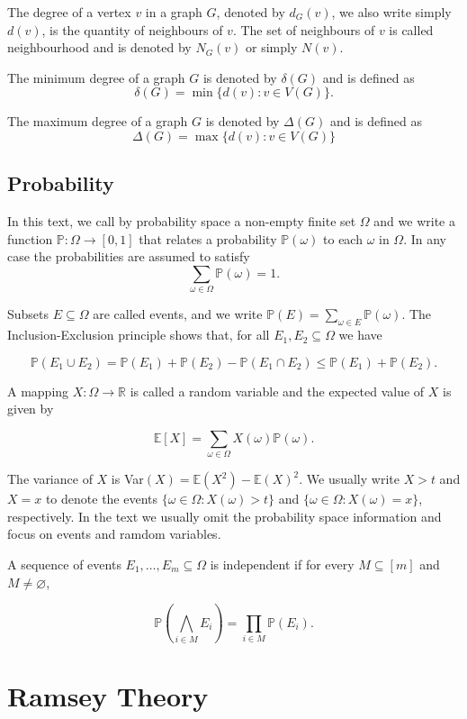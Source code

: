 \documentclass[12pt,twoside,a4paper,bibliography=totocnumbered]{book}
\numberwithin{equation}{section}
\let\emptyset=\varnothing
\theoremstyle{remark}
\begin{document}
The degree of a vertex $v$ in a graph $G$, denoted by $d_G(v)$, we also write simply $d(v)$, is the quantity of neighbours of $v$. The set of neighbours of $v$ is called neighbourhood and is denoted by $N_G(v)$ or simply $N(v)$.

The minimum degree of a graph $G$ is denoted by $\delta(G)$ and is defined as
$$\delta(G) = \min\{d(v) \colon v \in V (G)\}.$$

The maximum degree of a graph $G$ is denoted by $\Delta(G)$ and is defined as 
$$ \Delta(G) = \max\{d(v) \colon v \in V(G)\} $$

\section{Probability}
In this text, we call by probability space a non-empty finite set $\Omega$ and we write a function $\mathbb{P}\colon \Omega \rightarrow [0,1]$ that relates a probability $\mathbb{P}(\omega)$ to each $\omega$ in $\Omega$. In any case the probabilities are assumed to satisfy
$$ \sum_{\omega \in \Omega} \mathbb{P}(\omega) = 1.$$

Subsets $E \subseteq \Omega$ are called events, and we write $\mathbb{P}(E) = \sum_{\omega \in E}\mathbb{P}(\omega)$. The Inclusion-Exclusion principle shows that, for all $E_1, E_2 \subseteq \Omega$ we have

$$ \mathbb{P}(E_1 \cup E_2) = \mathbb{P}(E_1) + \mathbb{P}(E_2) - \mathbb{P}(E_1 \cap E_2) \leq \mathbb{P}(E_1) + \mathbb{P}(E_2).$$

A mapping $X\colon \Omega \rightarrow \mathbb{R}$ is called a random variable and the expected value of $X$ is given by

$$ \mathbb{E}[X] = \sum_{\omega \in \Omega}X(\omega)\mathbb{P}(\omega) .$$

The variance of $X$ is Var$(X) = \mathbb{E}(X^2) - \mathbb{E}(X)^2$. We usually write $X > t$ and $X = x$ to denote the events $\{\omega 
\in \Omega \colon X(\omega) > t\}$ and $\{\omega \in \Omega \colon X(\omega) = x\}$, respectively. In the text we usually omit the probability space information and focus on events and ramdom variables. 

A sequence of events $E_1,\ldots,E_m \subseteq \Omega$ is independent if for every $M \subseteq [m]$ and $M \neq \emptyset$,

$$ \mathbb{P}\left( \bigwedge_{i \in M}E_i \right) = \prod_{i \in M} \mathbb{P}(E_i).$$

\chapter{Ramsey Theory}
\end{document}
